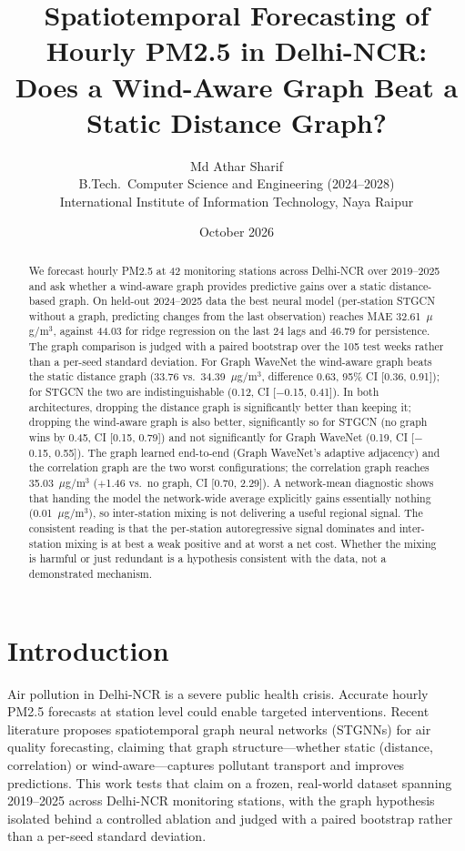 \documentclass[11pt,a4paper]{article}
\title{Spatiotemporal Forecasting of Hourly PM2.5 in Delhi-NCR:\\
Does a Wind-Aware Graph Beat a Static Distance Graph?}
\author{Md Athar Sharif\\
\small B.Tech.\ Computer Science and Engineering (2024--2028)\\
\small International Institute of Information Technology, Naya Raipur}
\date{October 2026}
\begin{document}
\maketitle

\begin{abstract}
We forecast hourly PM2.5 at 42 monitoring stations across Delhi-NCR over
2019--2025 and ask whether a wind-aware graph provides predictive gains over a
static distance-based graph. On held-out 2024--2025 data the best neural model
(per-station STGCN without a graph, predicting changes from the last observation)
reaches MAE 32.61~$\mu$g/m$^3$, against 44.03 for ridge regression on the last
24 lags and 46.79 for persistence. The graph comparison is judged with a paired
bootstrap over the 105 test weeks rather than a per-seed standard deviation.
For Graph WaveNet the wind-aware graph beats the static distance graph
(33.76 vs.\ 34.39~$\mu$g/m$^3$, difference 0.63, 95\% CI [0.36, 0.91]);
for STGCN the two are indistinguishable (0.12, CI [$-$0.15, 0.41]).
In both architectures, dropping the distance graph is significantly better than
keeping it; dropping the wind-aware graph is also better, significantly so for
STGCN (no graph wins by 0.45, CI [0.15, 0.79]) and not significantly for
Graph WaveNet (0.19, CI [$-$0.15, 0.55]).
The graph learned end-to-end (Graph WaveNet's adaptive adjacency) and the
correlation graph are the two worst configurations; the correlation graph
reaches 35.03~$\mu$g/m$^3$ ($+$1.46 vs.\ no graph, CI [0.70, 2.29]).
A network-mean diagnostic shows that handing the model the network-wide
average explicitly gains essentially nothing (0.01~$\mu$g/m$^3$), so
inter-station mixing is not delivering a useful regional signal.
The consistent reading is that the per-station autoregressive signal dominates
and inter-station mixing is at best a weak positive and at worst a net cost.
Whether the mixing is harmful or just redundant is a hypothesis consistent
with the data, not a demonstrated mechanism.
\end{abstract}

\section{Introduction}
Air pollution in Delhi-NCR is a severe public health crisis.  Accurate hourly
PM2.5 forecasts at station level could enable targeted interventions.  Recent
literature proposes spatiotemporal graph neural networks (STGNNs) for air
quality forecasting, claiming that graph structure---whether static
(distance, correlation) or wind-aware---captures pollutant transport and
improves predictions.  This work tests that claim on a frozen, real-world
dataset spanning 2019--2025 across Delhi-NCR monitoring stations, with the
graph hypothesis isolated behind a controlled ablation and judged with a
paired bootstrap rather than a per-seed standard deviation.
\end{document}
